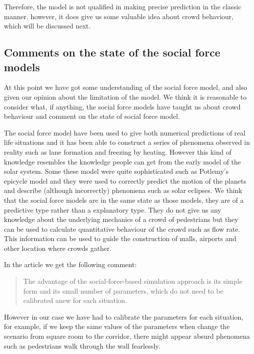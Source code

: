 Therefore, the model is not qualified in making precise prediction in the classic 
manner. however, it does give us some valuable idea about crowd behaviour, which 
will be discussed next.

\subsection{Comments on the state of the social force models}
At this point we have got some understanding of the social force model, and 
also given our opinion about the limitation of the model. We think it is 
reasonable to consider what, if anything, the social force models have taught 
us about crowd behaviour and comment on the state of social force model. 

The social force model have been used to give both numerical predictions of 
real life situations and it has been able to construct a series of phenomena 
observed in reality such as lane formation and freezing by heating.
However this kind of knowledge resembles the knowledge people can get from 
the early model of the solar system. Some these model were quite sophisticated 
such as Potlemy's epicycle model and they were used to correctly predict the 
motion of the planets and describe (although incorrectly) phenomena such as 
solar eclipses.
We think that the social force models are in the same state as those models, 
they are of a predictive type rather than a explanatory type. They do not give 
us any knowledge about the underlying mechanics of a crowd of pedestrians but 
they can be used to calculate quantitative behaviour of the crowd such 
as flow rate. This information can be used to guide the construction of malls, 
airports and other location where crowds gather.

In the article \cite{self-org}  we get the following comment:

\begin{quote}
	The advantage of the social-force-based simulation
	approach is its simple form and its small number of
	parameters, which do not need to be calibrated anew
	for each situation.
\end{quote}

However in our case we have had to calibrate the parameters for each 
situation, for example, if we keep the same values of the parameters when 
change the scenario from square room to the corridor, there might appear 
absurd phenomena such as pedestrians walk through the wall fearlessly. 

